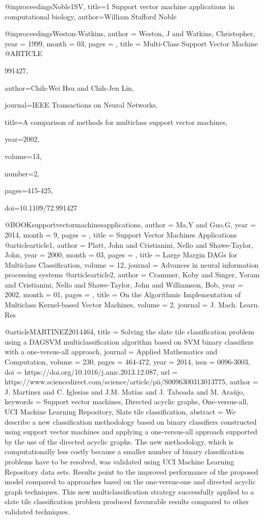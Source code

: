 \begin{thebibliography}{widestlabel}
@inproceedings{Noble1SV,
	title={1 Support vector machine applications in computational biology},
	author={William Stafford Noble}
}

@inproceedings{Weston-Watkins,
	author = {Weston, J and Watkins, Christopher},
	year = {1999},
	month = {03},
	pages = {},
	title = {Multi-Class Support Vector Machine}
}
@ARTICLE{991427,
	
	author={Chih-Wei Hsu and Chih-Jen Lin},
	
	journal={IEEE Transactions on Neural Networks}, 
	
	title={A comparison of methods for multiclass support vector machines}, 
	
	year={2002},
	
	volume={13},
	
	number={2},
	
	pages={415-425},
	
	doi={10.1109/72.991427}}

@BOOK{supportvectormachinesapplications,
	author = {Ma,Y and Guo,G},
	year = {2014},
	month = {9},
	pages = {},
	title = {Support Vector Machines Applications}
}
@article{article1,
	author = {Platt, John and Cristianini, Nello and Shawe-Taylor, John},
	year = {2000},
	month = {03},
	pages = {},
	title = {Large Margin DAGs for Multiclass Classification},
	volume = {12},
	journal = {Advances in neural information processing systems}
}
@article{article2,
	author = {Crammer, Koby and Singer, Yoram and Cristianini, Nello and Shawe-Taylor, John and Williamson, Bob},
	year = {2002},
	month = {01},
	pages = {},
	title = {On the Algorithmic Implementation of Multiclass Kernel-based Vector Machines},
	volume = {2},
	journal = {J. Mach. Learn. Res}
}

@article{MARTINEZ2014464,
	title = {Solving the slate tile classification problem using a DAGSVM multiclassification algorithm based on SVM binary classifiers with a one-versus-all approach},
	journal = {Applied Mathematics and Computation},
	volume = {230},
	pages = {464-472},
	year = {2014},
	issn = {0096-3003},
	doi = {https://doi.org/10.1016/j.amc.2013.12.087},
	url = {https://www.sciencedirect.com/science/article/pii/S0096300313013775},
	author = {J. Mart\'inez and C. Iglesias and J.M. Mat\'ias and J. Taboada and M. Ara\'ujo},
	keywords = {Support vector machines, Directed acyclic graphs, One-versus-all, UCI Machine Learning Repository, Slate tile classification},
	abstract = {We describe a new classification methodology based on binary classifiers constructed using support vector machines and applying a one-versus-all approach supported by the use of the directed acyclic graphs. The new methodology, which is computationally less costly because a smaller number of binary classification problems have to be resolved, was validated using UCI Machine Learning Repository data sets. Results point to the improved performance of the proposed model compared to approaches based on the one-versus-one and directed acyclic graph techniques. This new multiclassification strategy successfully applied to a slate tile classification problem produced favourable results compared to other validated techniques.}
}


\end{thebibliography}
